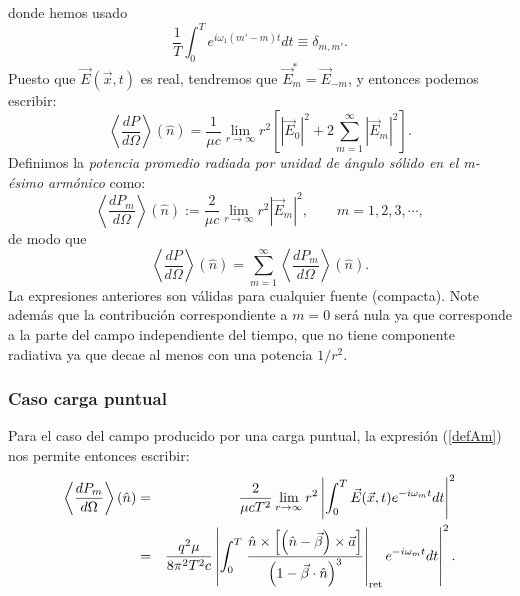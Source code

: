 donde hemos usado
\begin{equation}
\frac{1}{T}\int_0^{T}e^{i\omega_1\left(m'-m\right)t }dt\equiv\delta_{m,m' }.
\end{equation}
Puesto que $\vec{E}(\vec{x},t)$ es real, tendremos que $\vec{E}_{m}^*=\vec{E}_{-m}$, y entonces podemos escribir:
\begin{equation}\label{dPdOsumm}
\left\langle\frac{dP}{d\Omega}\right\rangle (\hat{n}) =\frac{1}{\mu c}\lim_{r\to\infty}r^2\left[\left|\vec{E}_0\right|^2
+2\sum_{m=1}^{\infty}\left|\vec{E}_{m}\right|^2\right].
\end{equation}
Definimos la \textit{potencia promedio radiada por
unidad de ángulo sólido en el m-ésimo armónico} como:
\begin{equation}
\boxed{\left\langle\frac{dP_{m}}{d\Omega}\right\rangle (\hat{n}) :=\frac{2}{\mu c}\lim_{r\to\infty}r^2\left|\vec{E}_{m}\right|^2, \qquad m=1,2,3,\cdots,}
\end{equation}
de modo que
\begin{equation}
\boxed{\left\langle\frac{dP}{d\Omega}\right\rangle (\hat{n}) = \sum_{m=1}^{\infty}\left\langle\frac{dP_{m}}{d\Omega}\right\rangle (\hat{n}) .}
\end{equation}
La expresiones anteriores son válidas para cualquier fuente (compacta). Note además que la contribución correspondiente a $m=0$ será nula ya que corresponde a la parte del campo independiente del tiempo, que no tiene componente radiativa ya que decae al menos con una potencia $1/r^2$.

\subsubsection{Caso carga puntual}
Para el caso del campo producido por una carga puntual, la expresión (\ref{defAm}) nos permite entonces escribir:
\begin{eqnarray}
\left\langle \frac{dP_{m}}{d\Omega}\right\rangle (\hat{n})&=&
\frac{2}{\mu cT^2}\lim_{r\to\infty}r^2\left|\int_0^{T}\vec{E}(\vec{x},t)e^{-i\omega_{m}t}dt\right|^2\\
&=&\frac{q^2\mu}{8\pi^2T^2c}\left| \int_0^{T}\left.\frac{\hat{n}\times\left[  \left(\hat{n}-\vec{\beta}\right)\times\vec{a}\right] }{\left(
1-\vec{\beta}\cdot\hat{n}\right)^3}\right|_{\rm ret} e^{-i\omega_{m}t}dt\right|^2.
\end{eqnarray}

